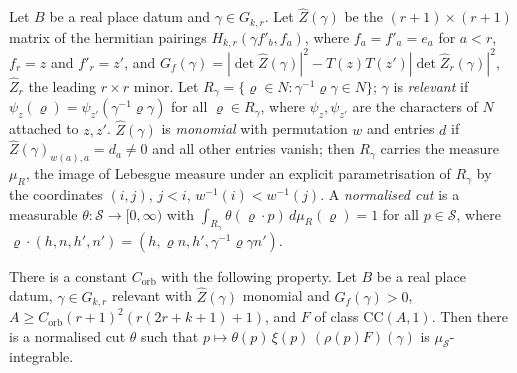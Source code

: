 \begin{definition}\label{pf:sh-curv:orbdef}
Let $B$ be a real place datum and $\gamma\in G_{k,r}$. Let $\widehat Z(\gamma)$ be the $(r+1)\times(r+1)$ matrix of the
hermitian pairings $H_{k,r}(\gamma f'_b,f_a)$, where $f_a=f'_a=e_a$ for $a<r$, $f_r=z$ and $f'_r=z'$, and
$G_f(\gamma)=|\det\widehat Z(\gamma)|^2-T(z)T(z')|\det\widehat Z_r(\gamma)|^2$, $\widehat Z_r$ the leading $r\times r$ minor.
Let $R_\gamma=\{\varrho\in N:\gamma^{-1}\varrho\gamma\in N\}$; $\gamma$ is \emph{relevant} if
$\psi_z(\varrho)=\psi_{z'}(\gamma^{-1}\varrho\gamma)$ for all $\varrho\in R_\gamma$, where $\psi_z,\psi_{z'}$ are the
characters of $N$ attached to $z,z'$. $\widehat Z(\gamma)$ is \emph{monomial} with permutation $w$ and entries $d$ if
$\widehat Z(\gamma)_{w(a),a}=d_a\ne0$ and all other entries vanish; then $R_\gamma$ carries the measure $\mu_R$, the image of
Lebesgue measure under an explicit parametrisation of $R_\gamma$ by the coordinates $(i,j)$, $j<i$, $w^{-1}(i)<w^{-1}(j)$. A
\emph{normalised cut} is a measurable $\theta\colon\mathcal S\to[0,\infty)$ with
$\int_{R_\gamma}\theta(\varrho\cdot p)\,d\mu_R(\varrho)=1$ for all $p\in\mathcal S$, where
$\varrho\cdot(h,n,h',n')=(h,\varrho n,h',\gamma^{-1}\varrho\gamma n')$.
\end{definition}

\begin{theorem}\label{pf:sh-curv:orb}
There is a constant $C_{\mathrm{orb}}$ with the following property. Let $B$ be a real place datum, $\gamma\in G_{k,r}$
relevant with $\widehat Z(\gamma)$ monomial and $G_f(\gamma)>0$, $A\ge C_{\mathrm{orb}}(r+1)^2(r(2r+k+1)+1)$, and $F$ of
class $\mathrm{CC}(A,1)$. Then there is a normalised cut $\theta$ such that $p\mapsto\theta(p)\,\xi(p)\,(\rho(p)F)(\gamma)$ is
$\mu_{\mathcal S}$-integrable.
\end{theorem}

